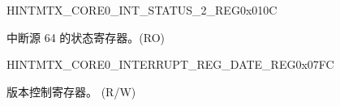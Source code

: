 \begin{register}{H}{INTMTX\_CORE0\_INT\_STATUS\_2\_REG}{0x010C}\label{regdesc:INTMTXCORE0INTSTATUS2REG}
%
\regnewline%
\begin{regdesc}\begin{reglist}
\label{fielddesc:INTMTXCORE0INTSTATUS2}\item [INTMTX\_CORE0\_INT\_STATUS\_2] 中断源 64 的状态寄存器。(RO)
\end{reglist}\end{regdesc}
\end{register}




\begin{register}{H}{INTMTX\_CORE0\_INTERRUPT\_REG\_DATE\_REG}{0x07FC}\label{regdesc:INTMTXCORE0INTERRUPTREGDATEREG}
%
%
\regnewline%
\begin{regdesc}\begin{reglist}
\label{fielddesc:INTMTXCORE0INTERRUPTREGDATE}\item [INTMTX\_CORE0\_INTERRUPT\_REG\_DATE] 版本控制寄存器。 (R/W)
\end{reglist}\end{regdesc}
\end{register}


